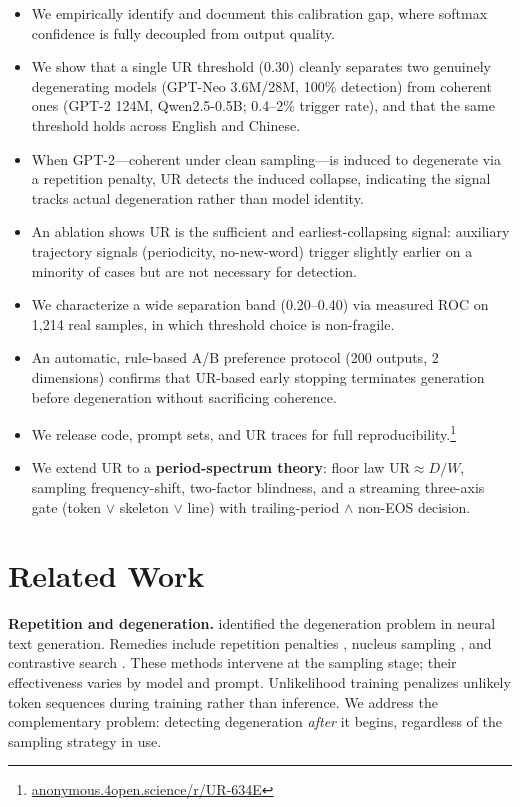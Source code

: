 \documentclass[11pt]{article}
\begin{document}
\begin{itemize}
    \item We empirically identify and document this calibration gap, where softmax confidence is fully decoupled from output quality.
    \item We show that a single UR threshold (0.30) cleanly separates two genuinely degenerating models (GPT-Neo 3.6M/28M, 100\% detection) from coherent ones (GPT-2 124M, Qwen2.5-0.5B; 0.4--2\% trigger rate), and that the same threshold holds across English and Chinese.
    \item When GPT-2---coherent under clean sampling---is induced to degenerate via a repetition penalty, UR detects the induced collapse, indicating the signal tracks actual degeneration rather than model identity.
    \item An ablation shows UR is the sufficient and earliest-collapsing signal: auxiliary trajectory signals (periodicity, no-new-word) trigger slightly earlier on a minority of cases but are not necessary for detection.
    \item We characterize a wide separation band (0.20--0.40) via measured ROC on 1,214 real samples, in which threshold choice is non-fragile.
    \item An automatic, rule-based A/B preference protocol (200 outputs, 2 dimensions) confirms that UR-based early stopping terminates generation before degeneration without sacrificing coherence.
    \item We release code, prompt sets, and UR traces for full reproducibility.\footnote{\url{anonymous.4open.science/r/UR-634E}}
    \item We extend UR to a \textbf{period-spectrum theory}: floor law $\mathrm{UR}\approx D/W$, sampling frequency-shift, two-factor blindness, and a streaming three-axis gate (token $\lor$ skeleton $\lor$ line) with trailing-period $\land$ non-EOS decision.
\end{itemize}

\section{Related Work}

\textbf{Repetition and degeneration.} \citet{holtzman2020} identified the degeneration problem in neural text generation. Remedies include repetition penalties \citep{keskar2019}, nucleus sampling \citep{holtzman2020}, and contrastive search \citep{su2022}. These methods intervene at the sampling stage; their effectiveness varies by model and prompt. Unlikelihood training \citep{welleck2020} penalizes unlikely token sequences during training rather than inference. We address the complementary problem: detecting degeneration \emph{after} it begins, regardless of the sampling strategy in use.
\end{document}
